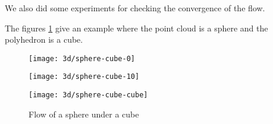 We also did some experiments for checking the convergence of the flow.

The figures \ref{fig:3d-flow-sphere-cube} give an example where the point cloud
is a sphere and the polyhedron is a cube.

\begin{figure}[h]
    \centering
    \begin{minipage}{0.32\linewidth}
        \centering
        \texttt{[image: 3d/sphere-cube-0]}
    \end{minipage}
    \begin{minipage}{0.32\linewidth}
        \centering
        \texttt{[image: 3d/sphere-cube-10]}
    \end{minipage}
    \begin{minipage}{0.32\linewidth}
        \centering
        \texttt{[image: 3d/sphere-cube-cube]}
    \end{minipage}

    \caption{Flow of a sphere under a cube}
    \label{fig:3d-flow-sphere-cube}
\end{figure}


